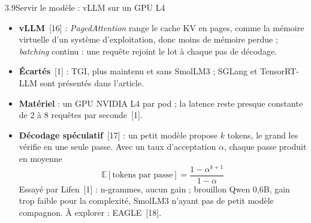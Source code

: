 \documentclass[11pt,aspectratio=169]{beamer}
\newcommand{\refs}[1]{{\color{mlblue}[#1]}}
\begin{document}
\begin{frame}{3.9\quad Servir le modèle : vLLM sur un GPU L4}
  \small
  \begin{itemize}
    \item \textbf{vLLM}~\refs{16} : \emph{PagedAttention} range le cache KV en pages, comme la
      mémoire virtuelle d'un système d'exploitation, donc moins de mémoire perdue ;
      \emph{batching} continu : une requête rejoint le lot à chaque pas de décodage.
    \item \textbf{Écartés}~\refs{1} : TGI, plus maintenu et sans SmolLM3 ; SGLang et
      TensorRT-LLM sont présentés dans l'article.
    \item \textbf{Matériel} : un GPU NVIDIA L4 par pod ; la latence reste presque constante de
      2 à 8 requêtes par seconde~\refs{1}.
    \item \textbf{Décodage spéculatif}~\refs{17} : un petit modèle propose $k$ tokens, le grand
      les vérifie en une seule passe. Avec un taux d'acceptation $\alpha$, chaque passe
      produit en moyenne
      \[
        \mathbb{E}[\text{tokens par passe}] = \frac{1 - \alpha^{k+1}}{1 - \alpha}
      \]
      Essayé par Lifen~\refs{1} : n-grammes, aucun gain ; brouillon Qwen 0,6B, gain trop
      faible pour la complexité, SmolLM3 n'ayant pas de petit modèle compagnon. À explorer :
      EAGLE~\refs{18}.
  \end{itemize}
\end{frame}
\end{document}
